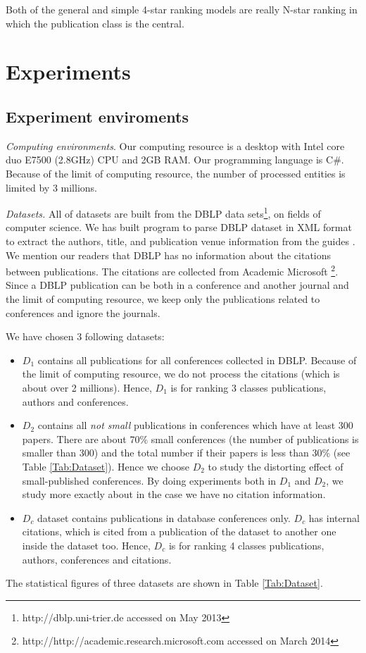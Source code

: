 \documentclass[10pt,leqno,twoside]{article}
\begin{document}
Both of the general and simple  4-star ranking models are really N-star ranking in which the publication class is the central.



\section{Experiments}\label{Sect:Experiments}
\subsection{Experiment enviroments}\label{Sect:Dataset}
\textit{Computing environments}.
Our computing resource is a desktop with Intel core duo E7500 (2.8GHz) CPU and 2GB RAM.  Our programming language is C\#.
Because of the limit of computing resource, the number of processed entities is limited by 3 millions.

\textit{Datasets.} All of datasets are built from the DBLP data sets\footnote{http://dblp.uni-trier.de accessed on May 2013}, on fields of computer science. We has built program to parse DBLP dataset in XML format to extract the authors, title, and publication venue information from the guides \cite{MichaelLey09,MichaelLey06}. We mention our readers that DBLP has no information about the citations between publications. The citations are collected from Academic Microsoft \footnote{http://http://academic.research.microsoft.com accessed on March 2014}. Since a DBLP publication can be both in a conference and another journal and the limit of computing resource, we keep only the publications related to conferences and ignore the journals.


We have chosen 3 following datasets:
\begin{itemize}
\item $D_1$ contains all publications for all conferences collected in DBLP. Because of the limit of computing resource, we do not process the citations (which is about over 2 millions). Hence, $D_1$ is for ranking 3 classes publications, authors and conferences.
\item $D_2$ contains all \textit{not small} publications in conferences which have at least 300 papers. There are about 70\% small conferences (the number of publications is smaller than 300) and the total number if their papers is less than 30\% (see Table \ref{Tab:Dataset}). Hence we choose $D_2$ to study the distorting effect of small-published conferences. By doing experiments both in $D_1$ and $D_2$, we study more exactly about in the case we have no citation information.
\item $D_c$ dataset contains publications in database conferences only. $D_c$ has internal citations, which is cited from a publication of the dataset to another one inside the dataset too.  Hence, $D_c$ is for ranking 4 classes publications, authors, conferences and citations.
\end{itemize}
The statistical figures of three datasets are shown in Table \ref{Tab:Dataset}.
\end{document}
